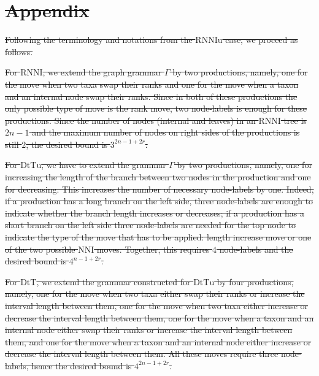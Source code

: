 \documentclass[11pt]{amsart}
\theoremstyle{definition}
\newcommand{\nni}{\mathrm{NNI}}
\newcommand{\rnni}{\mathrm{RNNI}}
\newcommand{\rnniu}{\mathrm{RNNIu}}
\newcommand{\dtt}{\mathrm{DtT}}
\newcommand{\dttu}{\mathrm{DtTu}}
\providecommand{\DIFdeltex}[1]{{\protect\color{red}\sout{#1}}}                      %
\providecommand{\DIFdel}[1]{\texorpdfstring{\DIFdeltex{#1}}{}} %
\begin{document}

\section{\DIFdel{Appendix}}
\addtocounter{section}{-1}%

\DIFdel{Following the terminology and notations from the $\rnniu$ case, we proceed as follows.
}%

\DIFdel{For $\rnni$, we extend the graph grammar $\Gamma$ by two productions, namely, one for the move when two taxa swap their ranks and one for the move when a taxon and an internal node swap their ranks.
Since in both of these productions the only possible type of move is the rank move, two node-labels is enough for these productions.
Since the number of nodes (internal and leaves) in an $\rnni$ tree is $2n - 1$ and the maximum number of nodes on right sides of the productions is still $2$, the desired bound is $3^{2n-1 + 2r}$.
}%

\DIFdel{For $\dttu$, we have to extend the grammar $\Gamma$ by two productions, namely, one for increasing the length of the branch between two nodes in the production and one for decreasing.
This increases the number of necessary node-labels by one.
Indeed, if a production has a long branch on the left side, three node-labels are enough to indicate whether the branch length increases or decreases; if a production has a short branch on the left side three node-labels are needed for the top node to indicate the type of the move that has to be applied: length increase move or one of the two possible $\nni$ moves.
Together, this requires $4$ node-labels and the desired bound is $4^{n-1 + 2r}$.
}%

\DIFdel{For $\dtt$, we extend the grammar constructed for $\dttu$ by four productions, namely, one for the move when two taxa either swap their ranks or increase the interval length between them, one for the move when two taxa either increase or decrease the interval length between them, one for the move when a taxon and an internal node either swap their ranks or increase the interval length between them, and one for the move when a taxon and an internal node either increase or decrease the interval length between them.
All these moves require three node-labels, hence the desired bound is $4^{2n-1 + 2r}$.
}%
\end{document}
